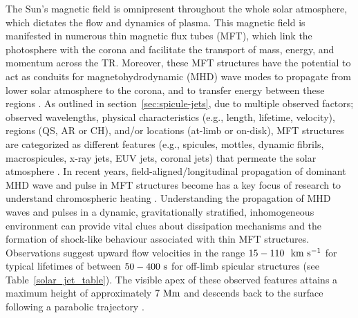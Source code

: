 The Sun's magnetic field is omnipresent throughout the whole solar atmosphere, which dictates the flow and dynamics of plasma. This magnetic field is manifested in numerous thin magnetic flux tubes (MFT), which link the photosphere with the corona and facilitate the transport of mass, energy, and momentum across the TR. Moreover, these MFT structures have the potential to act as conduits for magnetohydrodynamic (MHD) wave modes to propagate from lower solar atmosphere to the corona, and to transfer energy between these regions \citep{Pontieu2004Natur, Kukhianidze2006AA, Zaqarashvili2007A&A, He2009AA497525H}. As outlined in section~\ref{sec:spicule-jets}, due to multiple observed factors; observed wavelengths, physical characteristics (e.g., length, lifetime, velocity), regions (QS, AR or CH), and/or locations (at-limb or on-disk), MFT structures are categorized as different features (e.g., spicules, mottles, dynamic fibrils, macrospicules, x-ray jets, EUV jets, coronal jets) that permeate the solar atmosphere \citep[see reviews by:][]{Beckers1968, Beckers1972ARA&A, Tsiropoula2012}.  In recent years, field-aligned/longitudinal propagation of dominant MHD wave and pulse in MFT structures become has a key focus of research to understand chromospheric heating \citep{Narain1990, Zaqarashvili_2009SSRv, Jess2015}. Understanding the propagation of MHD waves and pulses in a dynamic, gravitationally stratified, inhomogeneous environment can provide vital clues about dissipation mechanisms and the formation of shock-like behaviour associated with thin MFT structures. Observations suggest upward flow velocities in the range $15-110 ~~\rm{km ~s^{-1}}$ for typical lifetimes of between $50-400~\rm{s}$ for off-limb spicular structures (see Table~\ref{solar_jet_table}). The visible apex of these observed features attains a maximum height of approximately $7~\rm{Mm}$ and descends back to the surface following a parabolic trajectory \citep{Pereira2012,Pereira2016ApJ82465P}. \np
%
